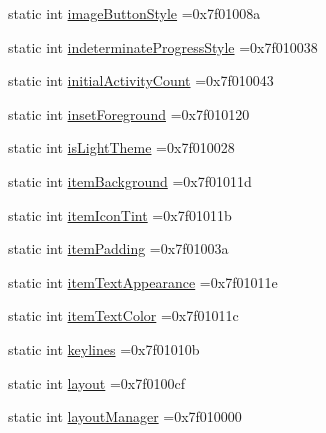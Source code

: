 \begin{DoxyCompactItemize}
\item 
static int \hyperlink{classandroid_1_1support_1_1graphics_1_1drawable_1_1animated_1_1R_1_1attr_a8ba499e5cf419920ff5174c5b6365499}{image\+Button\+Style} =0x7f01008a
\item 
static int \hyperlink{classandroid_1_1support_1_1graphics_1_1drawable_1_1animated_1_1R_1_1attr_ab068b9eaa0767347787c91f77114b471}{indeterminate\+Progress\+Style} =0x7f010038
\item 
static int \hyperlink{classandroid_1_1support_1_1graphics_1_1drawable_1_1animated_1_1R_1_1attr_a3df7bebfd13eab2e2e27e2fddd7a9072}{initial\+Activity\+Count} =0x7f010043
\item 
static int \hyperlink{classandroid_1_1support_1_1graphics_1_1drawable_1_1animated_1_1R_1_1attr_adcb520b2e17981d734985a6dcf1bf4dc}{inset\+Foreground} =0x7f010120
\item 
static int \hyperlink{classandroid_1_1support_1_1graphics_1_1drawable_1_1animated_1_1R_1_1attr_a1eb93aa3ecb74427d52d0805319ca1d7}{is\+Light\+Theme} =0x7f010028
\item 
static int \hyperlink{classandroid_1_1support_1_1graphics_1_1drawable_1_1animated_1_1R_1_1attr_a46deef0c66e8fee0eb05a6b1970a8cd3}{item\+Background} =0x7f01011d
\item 
static int \hyperlink{classandroid_1_1support_1_1graphics_1_1drawable_1_1animated_1_1R_1_1attr_a3a60443d6f62cfbc9aafbddb72ea0626}{item\+Icon\+Tint} =0x7f01011b
\item 
static int \hyperlink{classandroid_1_1support_1_1graphics_1_1drawable_1_1animated_1_1R_1_1attr_a62ed6d88a31437a2306540e5fadb6b19}{item\+Padding} =0x7f01003a
\item 
static int \hyperlink{classandroid_1_1support_1_1graphics_1_1drawable_1_1animated_1_1R_1_1attr_aac64abe6869bfdef8ed40f476c55a8e1}{item\+Text\+Appearance} =0x7f01011e
\item 
static int \hyperlink{classandroid_1_1support_1_1graphics_1_1drawable_1_1animated_1_1R_1_1attr_a84305594d8dfae507b76024a56f59092}{item\+Text\+Color} =0x7f01011c
\item 
static int \hyperlink{classandroid_1_1support_1_1graphics_1_1drawable_1_1animated_1_1R_1_1attr_a6fb7aad32c038f97c48e870ca09e1d8f}{keylines} =0x7f01010b
\item 
static int \hyperlink{classandroid_1_1support_1_1graphics_1_1drawable_1_1animated_1_1R_1_1attr_a79b5e399ed31f7092fb8da76cdc2423d}{layout} =0x7f0100cf
\item 
static int \hyperlink{classandroid_1_1support_1_1graphics_1_1drawable_1_1animated_1_1R_1_1attr_aec8314f39545054da6a5794e75ca9049}{layout\+Manager} =0x7f010000

\end{DoxyCompactItemize}
